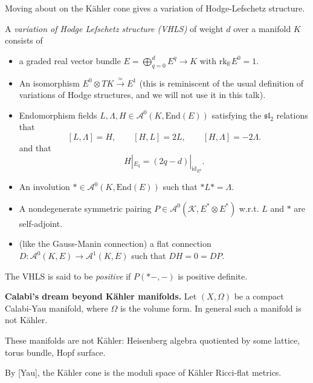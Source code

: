 \noindent
Moving about on the Kähler cone gives
a variation of Hodge-Lefschetz structure.

\begin{definition}
\label{definition-varia-hodge-lefsc-struc}
A {\it variation of Hodge Lefschetz structure
(VHLS)}
of weight $d$ over a manifold $K$ consists of
\begin{itemize}
\item a graded real vector bundle
$E=\bigoplus_{q=0}^d E^q \to K$
with $\text{rk}_\mathbb{R}E^0=1$.

\item An isomorphism $E^0 \otimes TK
\xrightarrow{\simeq}E^1$
(this is reminiscent of the usual definition
of variations of Hodge structures, and
we will not use it in this talk).

\item Endomorphism fields
$L, \Lambda,H \in
\mathcal{A}^0(K,\text{End}(E))$
satisfying the $\mathfrak{sl}_2$ relations
that
$$
[L,\Lambda]=H,\qquad [H,L]=2L,\qquad
[H,\Lambda]=-2\Lambda.
$$
and that
$$
H|_{E_q}=(2q-d)|_{\text{id}_{E^q}}.
$$
\item An involution $* \in
\mathcal{A}^0(K,\text{End}(E))$
such that $* L *=\Lambda$.

\item A nondegenerate symmetric pairing
$P \in \mathcal{A}^0(\mathcal{K},E^* \otimes
E^*)$
w.r.t. $L$ and $*$ are self-adjoint.

\item (like the Gauss-Manin connection)
a flat connection $D:
\mathcal{A}^0(K,E)\to\mathcal{A}^1(K,E)$
such that $DH=0=DP$.
\end{itemize}
The VHLS is said to be {\it positive} if
$P(*-,-)$
is positive definite.
\end{definition}

\noindent
{\bf Calabi's dream beyond Kähler manifolds.}
Let $(X,\Omega)$ be a compact Calabi-Yau
manifold,
where $\Omega$ is the volume form.
In general such a manifold is not Kähler.

\begin{example}
\label{example-non-kahler}
These manifolds are not Kähler:
Heisenberg algebra quotiented by some
lattice,
torus bundle, Hopf surface.
\end{example}

\noindent
By [Yau], the Kähler cone is the moduli
space of Kähler Ricci-flat metrics.

